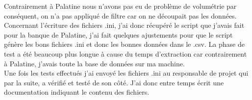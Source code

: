 Contrairement à Palatine nous n'avons pas eu de problème de volumétrie par conséquent, on n'a pas appliqué de filtre car on ne découpait pas les données.\\

Concernant l'écriture des fichiers .ini, j'ai donc récupéré le script que j'avais fait pour la banque de Palatine, j'ai fait quelques ajustements pour que le script génère les bons fichiers .ini et donc les bonnes données dans le .csv. La phase de test a été beaucoup plus longue à cause du temps d'extraction car contrairement à Palatine, j'avais toute la base de données sur ma machine.\\

Une fois les tests effectués j'ai envoyé les fichiers .ini au responsable de projet qui par la suite, a vérifié et testé de son côté. J'ai donc entre temps écrit une documentation indiquant le contenu des fichiers.



